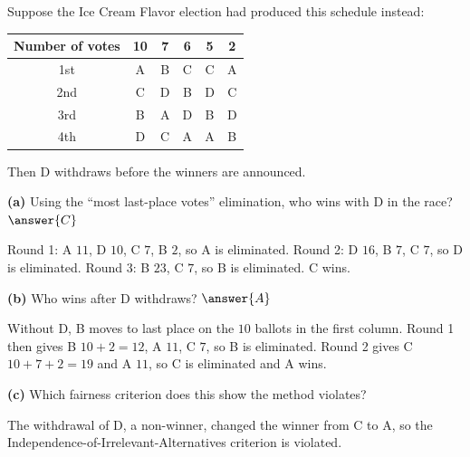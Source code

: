 \documentclass[12pt]{ximera}
\begin{document}
\begin{problem}
Suppose the Ice Cream Flavor election had produced this schedule instead:
\begin{center}
\begin{tabular}{c|ccccc}
Number of votes & 10 & 7 & 6 & 5 & 2\\\hline
1st & A & B & C & C & A\\
2nd & C & D & B & D & C\\
3rd & B & A & D & B & D\\
4th & D & C & A & A & B
\end{tabular}
\end{center}
Then D withdraws before the winners are announced.

\begin{prompt}
\textbf{(a)} Using the ``most last-place votes'' elimination, who wins with D in the
race? $\answer{C}$

\begin{feedback}
Round 1: A $11$, D $10$, C $7$, B $2$, so A is eliminated. Round 2: D $16$, B $7$,
C $7$, so D is eliminated. Round 3: B $23$, C $7$, so B is eliminated. C wins.
\end{feedback}
\end{prompt}

\begin{prompt}
\textbf{(b)} Who wins after D withdraws? $\answer{A}$

\begin{feedback}
Without D, B moves to last place on the $10$ ballots in the first column. Round 1 then
gives B $10+2=12$, A $11$, C $7$, so B is eliminated. Round 2 gives C $10+7+2=19$ and
A $11$, so C is eliminated and A wins.
\end{feedback}
\end{prompt}

\begin{prompt}
\textbf{(c)} Which fairness criterion does this show the method violates?

\begin{multipleChoice}
\end{multipleChoice}

\begin{feedback}
The withdrawal of D, a non-winner, changed the winner from C to A, so the
Independence-of-Irrelevant-Alternatives criterion is violated.
\end{feedback}
\end{prompt}
\end{problem}
\end{document}
